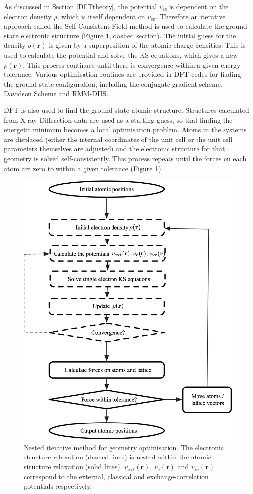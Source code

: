 As discussed in Section \ref{DFTtheory}, the potential $v_\textrm{ee}$ is dependent on the electron density $\rho$, which is itself dependent on $v_\textrm{ee}$. Therefore an iterative approach called the Self Consistent Field method is used to calculate the ground-state electronic structure (Figure \ref{SCF}, dashed section). The initial guess for the density $\rho(\textbf{r})$ is given by a superposition of the atomic charge densities. This is used to calculate the potential and solve the KS equations, which gives a new $\rho(\textbf{r})$. This process continues until there is convergence within a given energy tolerance. Various optimisation routines are provided in DFT codes for finding the ground state configuration, including the conjugate gradient scheme, Davidson Scheme and RMM-DIIS.

DFT is also used to find the ground state atomic structure. Structures calculated from X-ray Diffraction data are used as a starting guess, so that finding the energetic minimum becomes a local optimisation problem. Atoms in the systems are displaced (either the internal coordinates of the unit cell or the unit cell parameters themselves are adjusted) and the electronic structure for that geometry is solved self-consistently. This process repeats until the forces on each atom are zero to within a given tolerance (Figure \ref{SCF}). 

\begin{figure}[h]
\centering
  \includegraphics[width=0.7\columnwidth]{figures/ch3/scf.png}
  \caption[Nested iterative method for geometry optimisation]{Nested iterative method for geometry optimisation. The electronic structure relaxation (dashed lines) is nested within the atomic structure relaxation (solid lines). $v_\textrm{ext}(\textbf{r})$, $v_\textrm{c}(\textbf{r})$ and $v_\textrm{xc}(\textbf{r})$ correspond to the external, classical and exchange-correlation potentials respectively.} 
  \label{SCF}
\end{figure}
